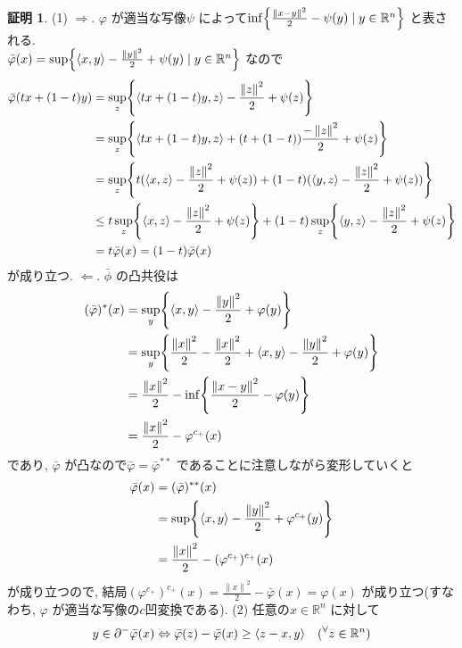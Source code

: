 \documentclass[10pt, fleqn, label-section=none, titlepage]{bxjsarticle}
\theoremstyle{definition}
\newtheorem*{pf*}{証明}
\newcommand{\any}{{}^{\forall}}
\newcommand{\cbra}[1]{\mleft\{#1\mright\}}
\newcommand{\tbra}[1]{\mleft\langle#1\mright\rangle}
\newcommand{\norm}[1]{\left\|#1\right\|}
\newcommand{\LR}{\Leftrightarrow}
\newcommand{\naraba}{\Rightarrow}
\newcommand{\gyaku}{\Leftarrow}
\renewcommand{\;}{\, ; \,}
\begin{document}
\begin{pf*}(1)
$\naraba$. $\varphi $ が適当な写像$\psi$ によって$\inf \cbra{\frac{\norm{x-y}^2}{2} - \psi (y) \mid y \in \mathbb R^n}$ と表される. \\
$\bar \varphi(x) = \sup \cbra{\tbra{x,y} - \frac{\norm y ^2}{ 2} + \psi(y) \mid y \in \mathbb R ^n}$ なので
\begin{align*}
\bar \varphi(tx + (1-t) y) &= \sup_z \cbra{\tbra{tx + (1-t)y, z} - \frac{\norm z ^2}{2} + \psi (z)} \\
&= \sup_z \cbra{\tbra{tx + (1-t)y, z} + (t + (1-t))\frac{-\norm z ^2}{2} + \psi (z)} \\
&= \sup_z \cbra{t(\tbra{x,z} - \frac{\norm z ^2}{ 2} + \psi (z)  ) + (1-t) (\tbra{y,z} - \frac{\norm z ^2}{2} + \psi (z))  } \\
&\leq t \sup_z \cbra{\tbra{x,z} - \frac{\norm z ^2}{ 2}  + \psi(z)} + (1-t) \sup_z \cbra{\tbra{y,z} - \frac{\norm z ^2}{ 2}  + \psi (z)} \\
&= t \bar \varphi(x) = (1-t) \bar \varphi(x) 
 \end{align*}
 が成り立つ. $\gyaku$. $\bar \phi$ の凸共役は
 \begin{align*} (\bar \varphi)^* (x) &= \sup_y \cbra{\tbra{x,y} - \frac{\norm y^2}{2} + \varphi(y) } \\
 &= \sup_y \cbra{\frac{\norm x^2}{2} - \frac{\norm x^2}{2} + \tbra{x,y} - \frac{\norm y ^2}{2} + \varphi(y)} \\
 &= \frac{\norm x ^2}{2} - \inf \cbra{\frac{\norm{x-y}^2}{2} - \varphi(y)} \\
 &= \frac{\norm x^2}{2} - \varphi^{c_+} (x) \end{align*}
 であり, $\bar \varphi$ が凸なので$\bar \varphi = \bar \varphi ^{**}$ であることに注意しながら変形していくと
 \begin{align*} \bar \varphi (x) &= (\bar \varphi)^{**} (x) \\
 &= \sup \cbra{\tbra{x,y} - \frac{\norm y^2}{2} + \varphi^{c_+} (y)} \\
 &= \frac{\norm x^2}{2} - (\varphi^{c_+})^{c_+} (x) \\
 \end{align*}
 が成り立つので, 結局$(\varphi ^{c_+})^{c_+} (x) = \frac{\norm x^2}{2} - \bar \varphi(x) = \varphi(x)$ が成り立つ(すなわち, $\varphi$ が適当な写像の$c$凹変換である).
 (2) 任意の$x \in \mathbb R ^n$ に対して
 \begin{align*} 
 y \in \partial^- \bar \varphi (x) &\LR \bar \varphi(z) - \bar \varphi(x) \geq \tbra{z - x, y} \quad (\any z \in \mathbb R^n) \\

\end{align*}
\end{pf*}
\end{document}
